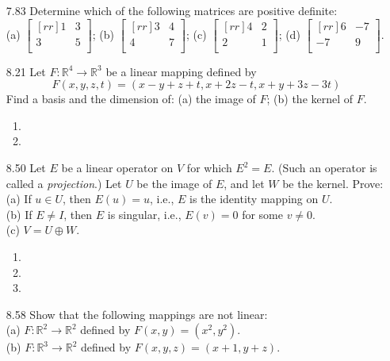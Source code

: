 \documentclass[12pt]{article}
\theoremstyle{definition}
\theoremstyle{plain}
\begin{document}
\begin{enumerate}
\item[7.83]Determine which of the following matrices are positive definite:\\
(a) $\begin{bmatrix}[rr]1&3\\3&5\\\end{bmatrix}$; (b) $\begin{bmatrix}[rr]3&4\\4&7\\\end{bmatrix}$; (c) $\begin{bmatrix}[rr]4&2\\2&1\\\end{bmatrix}$; (d) $\begin{bmatrix}[rr]6&-7\\-7&9\\\end{bmatrix}$.
\item[8.21]Let $F: \mathbb{R}^4\rightarrow\mathbb{R}^3$ be a linear mapping defined by
\[ F(x,y,z,t)=(x-y+z+t,x+2z-t,x+y+3z-3t) \]
Find a basis and the dimension of: (a) the image of $F$; (b) the kernel of $F$.
	\begin{enumerate}
	\item
	\item
	\end{enumerate}
\item[8.50]Let $E$ be a linear operator on $V$ for which $E^2=E$. (Such an operator is called a \textit{projection}.) Let $U$ be the image of $E$, and let $W$ be the kernel. Prove:\\
(a) If $u\in U$, then $E(u)=u$, i.e., $E$ is the identity mapping on $U$.\\
(b) If $E\neq I$, then $E$ is singular, i.e., $E(v)=0$ for some $v\neq 0$.\\
(c) $V=U\oplus W$.
	\begin{enumerate}
	\item
	\item
	\item
	\end{enumerate}
\item[8.58]Show that the following mappings are not linear:\\
(a) $F:\mathbb{R}^2\rightarrow\mathbb{R}^2$ defined by $F(x,y)=(x^2,y^2)$.\\
(b) $F:\mathbb{R}^3\rightarrow\mathbb{R}^2$ defined by $F(x,y,z)=(x+1,y+z)$.\\

\end{enumerate}
\end{document}
